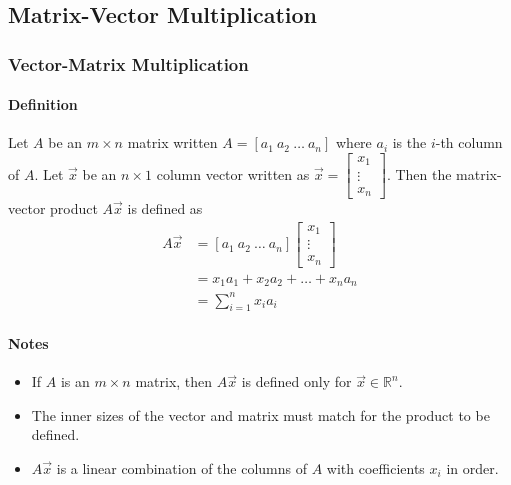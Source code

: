 \subsection{Matrix-Vector Multiplication}
\hrulefill
\subsubsection*{Vector-Matrix Multiplication}
\paragraph*{Definition}
Let $A$ be an $m \times n$ matrix written $A = [a_1 \ a_2 \ \ldots \ a_n]$ where $a_i$ is the $i$-th column of $A$. 
Let $\vec{x}$ be an $n \times 1$ column vector written as $\vec{x} = \begin{bmatrix}
    x_1 \\
    \vdots \\
    x_n
\end{bmatrix}$. Then the matrix-vector product $A\vec{x}$ is defined as
\begin{align*}
    A\vec{x} &= [a_1 \ a_2 \ \ldots \ a_n] \begin{bmatrix}
    x_1 \\
    \vdots \\
    x_n
\end{bmatrix} \\
&= x_1a_1 + x_2a_2 + \ldots + x_na_n \\
&= \sum_{i=1}^n x_ia_i
\end{align*}

\paragraph*{Notes}
\begin{itemize}
    \item If $A$ is an $m \times n$ matrix, then $A\vec{x}$ is defined only for $\vec{x} \in \mathbb{R}^n$.
    \item The inner sizes of the vector and matrix must match for the product to be defined.
    \item $A\vec{x}$ is a linear combination of the columns of $A$ with coefficients $x_i$ in order.
\end{itemize}

